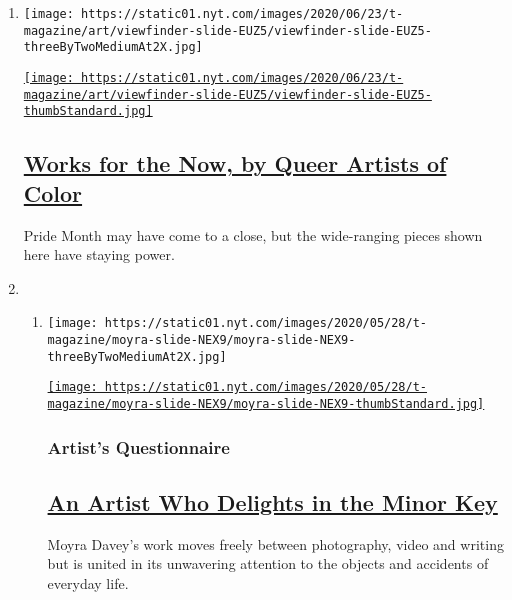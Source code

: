 \begin{enumerate}
\def\labelenumi{\arabic{enumi}.}
\item
  \texttt{[image: https://static01.nyt.com/images/2020/06/23/t-magazine/art/viewfinder-slide-EUZ5/viewfinder-slide-EUZ5-threeByTwoMediumAt2X.jpg]}

  \href{/2020/06/29/t-magazine/queer-bipoc-artists.html}{\texttt{[image: https://static01.nyt.com/images/2020/06/23/t-magazine/art/viewfinder-slide-EUZ5/viewfinder-slide-EUZ5-thumbStandard.jpg]}}

  \hypertarget{works-for-the-now-by-queer-artists-of-color}{%
  \subsection{\texorpdfstring{\href{/2020/06/29/t-magazine/queer-bipoc-artists.html}{Works
  for the Now, by Queer Artists of
  Color}}{Works for the Now, by Queer Artists of Color}}\label{works-for-the-now-by-queer-artists-of-color}}

  Pride Month may have come to a close, but the wide-ranging pieces
  shown here have staying power.
\item
  \begin{enumerate}
  \def\labelenumii{\arabic{enumii}.}
  \item
    \texttt{[image: https://static01.nyt.com/images/2020/05/28/t-magazine/moyra-slide-NEX9/moyra-slide-NEX9-threeByTwoMediumAt2X.jpg]}

    \href{/2020/05/29/t-magazine/moyra-davey.html}{\texttt{[image: https://static01.nyt.com/images/2020/05/28/t-magazine/moyra-slide-NEX9/moyra-slide-NEX9-thumbStandard.jpg]}}

    \hypertarget{artists-questionnaire}{%
    \subsubsection{Artist's Questionnaire}\label{artists-questionnaire}}

    \hypertarget{an-artist-who-delights-in-the-minor-key}{%
    \subsection{\texorpdfstring{\href{/2020/05/29/t-magazine/moyra-davey.html}{An
    Artist Who Delights in the Minor
    Key}}{An Artist Who Delights in the Minor Key}}\label{an-artist-who-delights-in-the-minor-key}}

    Moyra Davey's work moves freely between photography, video and
    writing but is united in its unwavering attention to the objects and
    accidents of everyday life.


\end{enumerate}
\end{enumerate}
